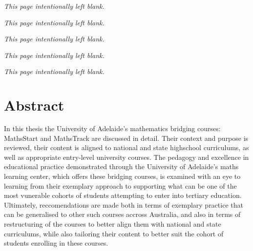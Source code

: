 \documentclass[twoside,12pt,a4paper]{report}
\makeatletter
\newcommand*{\intentionallyblankpage}{
  \vspace*{\fill}
  {\centering \textit{This page intentionally left blank.} \par}
  \vspace{\fill}}
\renewcommand*{\cleardoublepage}{\clearpage\if@twoside \ifodd\c@page\else
  \intentionallyblankpage
  \newpage
  \if@twocolumn\hbox{}\newpage\fi\fi\fi}
\makeatother
\begin{document}



\setcounter{page}{2}
\intentionallyblankpage
\newpage
\intentionallyblankpage
\cleardoublepage
\tableofcontents



\glsaddall
\newpage
\intentionallyblankpage
\printglossaries
{}



\glsresetall
\cleardoublepage
\chapter*{Abstract}

In this thesis the University of Adelaide's mathematics bridging courses: MathsStart and MathsTrack are discussed in detail. Their context and purpose is reviewed, their content is aligned to national and state highschool curriculums, as well as appropriate entry-level university courses. The pedagogy and excellence in educational practice demonstrated through the University of Adelaide's maths learning center, which offers these bridging courses, is examined with an eye to learning from their exemplary approach to supporting what can be one of the most vunerable cohorts of students attempting to enter into tertiary education. Ultimately, reccomendations are made both in terms of exemplary practice that can be generalised to other such courses accross Australia, and also in terms of restructuring of the courses to better align them with national and state curriculums, while also tailoring their content to better suit the cohort of students enrolling in these courses.




% 
\end{document}
